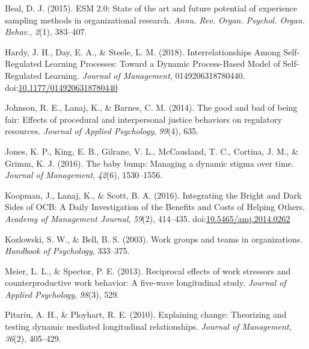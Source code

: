\documentclass[english,,man]{apa6}
\theoremstyle{definition}
\theoremstyle{definition}
\theoremstyle{definition}
\theoremstyle{remark}
\begin{document}
\setlength{\parindent}{-0.5in}
\setlength{\leftskip}{0.5in}

\hypertarget{refs}{}
\leavevmode\hypertarget{ref-beal_esm_2015}{}%
Beal, D. J. (2015). ESM 2.0: State of the art and future potential of
experience sampling methods in organizational research. \emph{Annu. Rev.
Organ. Psychol. Organ. Behav.}, \emph{2}(1), 383--407.

\leavevmode\hypertarget{ref-hardy_interrelationships_2018}{}%
Hardy, J. H., Day, E. A., \& Steele, L. M. (2018). Interrelationships
Among Self-Regulated Learning Processes: Toward a Dynamic Process-Based
Model of Self-Regulated Learning. \emph{Journal of Management},
0149206318780440.
doi:\href{https://doi.org/10.1177/0149206318780440}{10.1177/0149206318780440}

\leavevmode\hypertarget{ref-johnson_good_2014}{}%
Johnson, R. E., Lanaj, K., \& Barnes, C. M. (2014). The good and bad of
being fair: Effects of procedural and interpersonal justice behaviors on
regulatory resources. \emph{Journal of Applied Psychology},
\emph{99}(4), 635.

\leavevmode\hypertarget{ref-jones_baby_2016}{}%
Jones, K. P., King, E. B., Gilrane, V. L., McCausland, T. C., Cortina,
J. M., \& Grimm, K. J. (2016). The baby bump: Managing a dynamic stigma
over time. \emph{Journal of Management}, \emph{42}(6), 1530--1556.

\leavevmode\hypertarget{ref-koopman_integrating_2016}{}%
Koopman, J., Lanaj, K., \& Scott, B. A. (2016). Integrating the Bright
and Dark Sides of OCB: A Daily Investigation of the Benefits and Costs
of Helping Others. \emph{Academy of Management Journal}, \emph{59}(2),
414--435.
doi:\href{https://doi.org/10.5465/amj.2014.0262}{10.5465/amj.2014.0262}

\leavevmode\hypertarget{ref-kozlowski_work_2003}{}%
Kozlowski, S. W., \& Bell, B. S. (2003). Work groups and teams in
organizations. \emph{Handbook of Psychology}, 333--375.

\leavevmode\hypertarget{ref-meier_reciprocal_2013}{}%
Meier, L. L., \& Spector, P. E. (2013). Reciprocal effects of work
stressors and counterproductive work behavior: A five-wave longitudinal
study. \emph{Journal of Applied Psychology}, \emph{98}(3), 529.

\leavevmode\hypertarget{ref-pitariu_explaining_2010}{}%
Pitariu, A. H., \& Ployhart, R. E. (2010). Explaining change: Theorizing
and testing dynamic mediated longitudinal relationships. \emph{Journal
of Management}, \emph{36}(2), 405--429.
\end{document}
